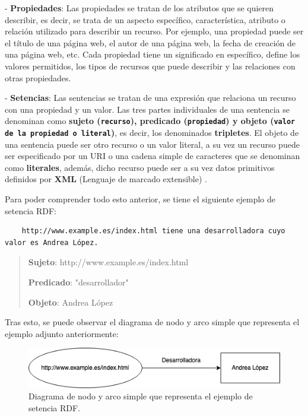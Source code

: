 \documentclass[11pt]{report}
\begin{document}
	- \textbf{Propiedades}: Las propiedades se tratan de los atributos que se quieren describir, es decir, se trata de un aspecto específico, característica, atributo o relación utilizado para describir un recurso. Por ejemplo, una propiedad puede ser el título de una página web, el autor de una página web, la fecha de creación de una página web, etc.  Cada propiedad tiene un significado en específico, define los valores permitidos, los tipos de recursos que puede describir y las relaciones con otras propiedades.

	- \textbf{Setencias}: Las sentencias se tratan de una expresión que relaciona un recurso con una propiedad y un valor. Las tres partes individuales de una sentencia se denominan como \textbf{sujeto (\texttt{recurso}), predicado (\texttt{propiedad}) y objeto (\texttt{valor de la propiedad o literal})}, es decir, los denominados \textbf{tripletes}. El objeto de una sentencia puede ser otro recurso o un valor literal, a su vez un recurso puede ser especificado por un URI o una cadena simple de caracteres que se denominan como \textbf{literales}, además, dicho recurso puede ser a su vez datos primitivos definidos por \textbf{XML} (Lenguaje de marcado extensible) \cite{6}. 

Para poder comprender todo esto anterior, se tiene el siguiente ejemplo de setencia RDF:

\begin{verbatim}
	http://www.example.es/index.html tiene una desarrolladora cuyo valor es Andrea López.
\end{verbatim}

\begin{quote}
	\textbf{Sujeto}: http://www.example.es/index.html

	\textbf{Predicado}: "desarrollador"

	\textbf{Objeto}: Andrea López 
\end{quote}	

	Tras esto, se puede observar el diagrama de nodo y arco simple que representa el ejemplo adjunto anteriormente:

	\begin{figure}[H]
		\centering
		\includegraphics[scale=0.7]{../img/Diagrama-Nodo-Arco.png}
		\caption{Diagrama de nodo y arco simple que representa el ejemplo de setencia RDF.}
		\label{fig:Diagrama-Nodo-Arco}
	\end{figure}
\end{document}
